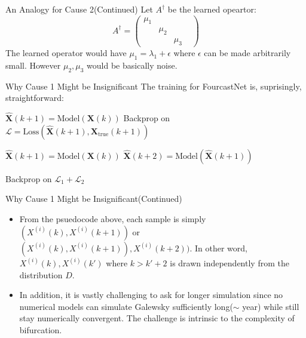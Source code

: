 \documentclass{beamer}
\begin{document}
\begin{frame}{An Analogy for Cause 2(Continued)}
Let $A^{\dagger}$ be the learned opeartor:
\begin{equation}
        A^{\dagger}=\begin{pmatrix}
            \mu _1 & &  \\
            & \mu_2 & &\\
            & & \mu_3  &
        \end{pmatrix}
\end{equation}
The learned operator would have $\mu_1 =\lambda_1 +\epsilon$ where $\epsilon$ can be made arbitrarily small. However $\mu_2, \mu_3$ would be basically noise.
\end{frame}

\begin{frame}{Why Cause 1 Might be Insignificant}
    The training for FourcastNet is, suprisingly, straightforward:
\begin{algorithm}[H]
\caption{Model Training Procedure}
\begin{algorithmic}[1]


        \STATE $\hat{\mathbf{X}}(k+1) = \text{Model}(\mathbf{X}(k))$
        \STATE Backprop on $\mathcal{L} = \text{Loss}(\hat{\mathbf{X}}(k+1), \mathbf{X}_{\text{true}}(k+1))$
    \ENDFOR
\ENDFOR


        \STATE $\hat{\mathbf{X}}(k+1) = \text{Model}(\mathbf{X}(k))$
        \quad  $\hat{\mathbf{X}}(k+2) = \text{Model}(\hat{\mathbf{X}}(k+1))$
    
        \STATE Backprop on $\mathcal L_1 +\mathcal L_2$
    \ENDFOR
\ENDFOR
\end{algorithmic}
\end{algorithm}

\end{frame}

\begin{frame}{Why Cause 1 Might be Insignificant(Continued)}
    \begin{itemize}
        \item From the psuedocode above, each sample is simply $(X^{(i)}(k),X^{(i)}(k+1))$ or $(X^{(i)}(k),X^{(i)}(k+1)),X^{(i)}(k+2))$. In other word, $X^{(i)}(k), X^{(i)}(k')$ where $k>k'+2$ is drawn independently from the distribution $D$.

        \item In addition, it is vastly challenging to ask for longer simulation since no numerical models can simulate Galewsky sufficiently long($\sim$ year) while still stay numerically convergent. The challenge is intrinsic to the complexity of bifurcation. 
    \end{itemize}
\end{frame}
\end{document}
